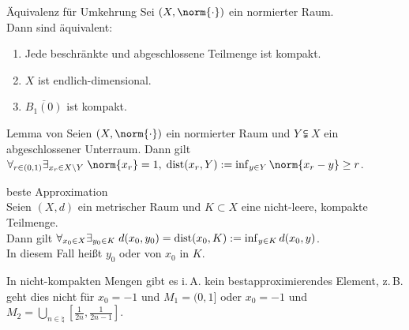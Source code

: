 \begin{Satz}{Äquivalenz für Umkehrung}
    Sei $(X, \norm{\cdot})$ ein normierter Raum.\\
    Dann sind äquivalent:
    \begin{enumerate}
        \item
        Jede beschränkte und abgeschlossene Teilmenge ist kompakt.
        
        \item
        $X$ ist endlich-dimensional.
        
        \item
        $\overline{B_1(0)}$ ist kompakt.
    \end{enumerate}
\end{Satz}


\begin{Lemma}{Lemma von }
    Seien $(X, \norm{\cdot})$ ein normierter Raum und
    $Y \subsetneqq X$ ein abgeschlossener Unterraum.
    Dann gilt $\forall_{r \in (0,1)} \exists_{x_r \in X \setminus Y}\;
    \norm{x_r} = 1,\; \dist(x_r, Y) := \inf_{y \in Y} \norm{x_r - y} \ge r$.
\end{Lemma}

\linie

\begin{Satz}{beste Approximation}\\
    Seien $(X, d)$ ein metrischer Raum und $K \subset X$ eine nicht-leere, kompakte Teilmenge.\\
    Dann gilt $\forall_{x_0 \in X} \exists_{y_0 \in K}\; d(x_0, y_0) = \operatorname{dist}(x_0, K)
    := \inf_{y \in K} d(x_0, y)$.\\
    In diesem Fall heißt $y_0$  oder
     von $x_0$ in $K$.
\end{Satz}

\begin{Bem}
    In nicht-kompakten Mengen gibt es i.\,A. kein bestapproximierendes Element,
    z.\,B. geht dies nicht für $x_0 = -1$ und $M_1 = (0, 1]$ oder
    $x_0 = -1$ und $M_2 = \bigcup_{n \in \natural} \left[\frac{1}{2n}, \frac{1}{2n-1}\right]$.
\end{Bem}

